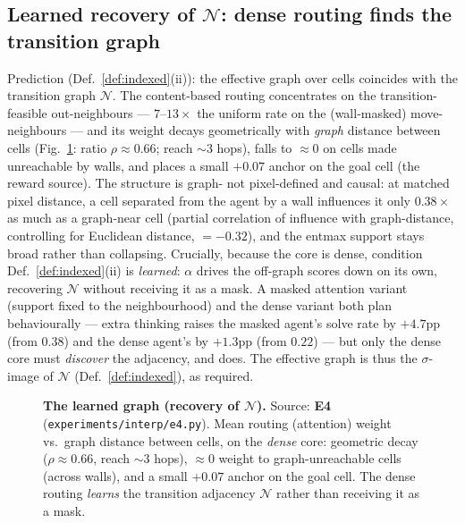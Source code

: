 \documentclass{article} %
\theoremstyle{plain}
\theoremstyle{definition}
\begin{document}
\subsection{Learned recovery of $\mathcal{N}$: dense routing finds the transition graph}
\label{sec:emp-routing}

Prediction (Def.~\ref{def:indexed}(ii)): the effective graph over cells coincides
with the transition graph $\mathcal{N}$. The content-based routing concentrates on the
transition-feasible out-neighbours --- $7$--$13\times$ the uniform rate on the
(wall-masked) move-neighbours --- and its weight decays geometrically with
\emph{graph} distance between cells (Fig.~\ref{fig:kernel}: ratio $\rho\approx0.66$;
reach $\sim\!3$ hops), falls to ${\approx}0$ on cells made unreachable by walls, and places a
small ${+}0.07$ anchor on the goal cell (the reward source). The structure is
graph- not pixel-defined and causal: at matched pixel distance, a cell separated
from the agent by a wall influences it only $0.38\times$ as much as a graph-near
cell (partial correlation of influence with graph-distance, controlling for
Euclidean distance, $=-0.32$), and the entmax support stays broad rather than
collapsing. Crucially, because the core is dense, condition
Def.~\ref{def:indexed}(ii) is \emph{learned}: $\alpha$ drives the off-graph
scores down on its own, recovering $\mathcal{N}$ without receiving it as a mask. A masked
attention variant (support fixed to the neighbourhood) and the dense variant both
plan behaviourally --- extra thinking raises the masked agent's solve rate by
${+}4.7$pp (from $0.38$) and the dense agent's by ${+}1.3$pp (from $0.22$) --- but
only the dense core must \emph{discover} the adjacency, and does. The effective
graph is thus the $\sigma$-image of $\mathcal{N}$ (Def.~\ref{def:indexed}), as required.

\begin{figure}[t]\centering
{}
\caption{\textbf{The learned graph (recovery of $\mathcal{N}$).} Source: \textbf{E4}
(\texttt{experiments/interp/e4.py}). Mean routing (attention) weight vs.\ graph distance
between cells, on the \emph{dense} core: geometric decay ($\rho\approx0.66$, reach $\sim$3
hops), ${\approx}0$ weight to graph-unreachable cells (across walls), and a small ${+}0.07$
anchor on the goal cell. The dense routing \emph{learns} the transition adjacency
$\mathcal{N}$ rather than receiving it as a mask.}
\label{fig:kernel}
\end{figure}
\end{document}
